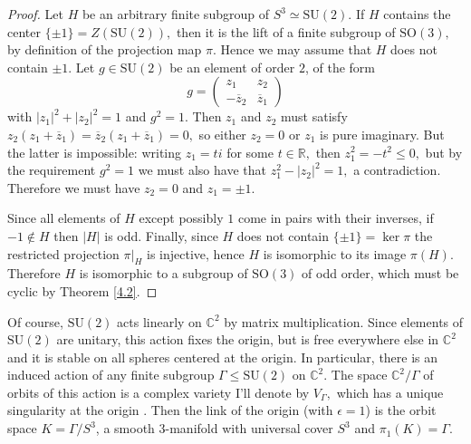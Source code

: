 \documentclass{article}
\begin{document}
\begin{proof}
Let $H$ be an arbitrary finite subgroup of $S^3 \simeq \mathrm{SU}(2)$. If $H$ contains the center $\{\pm 1\} = Z(\mathrm{SU}(2)),$ then it is the lift of a finite subgroup of $\mathrm{SO}(3),$ by definition of the projection map $\pi.$ Hence we may assume that $H$ does not contain $\pm 1$. Let $g \in \mathrm{SU}(2)$ be an element of order $2$, of the form
\[g = \begin{pmatrix} z_1 & z_2\\ -\overline{z}_2 & \overline{z}_1\end{pmatrix}\]
with $|z_1|^2 + |z_2|^2 = 1$ and $g^2 =1$. Then $z_1$ and $z_2$ must satisfy $z_2(z_1 + \overline{z}_1) = \overline{z}_2(z_1 + \overline{z}_1) = 0,$ so either $z_2 = 0$ or $z_1$ is pure imaginary. But the latter is impossible: writing $z_1 = ti$ for some $t \in \mathbb{R},$ then $z_1^2 = -t^2 \leq 0,$ but by the requirement $g^2 = 1$ we must also have that $z_1^2 - |z_2|^2 = 1,$ a contradiction. Therefore we must have $z_2 = 0$ and $z_1 = \pm 1$.

Since all elements of $H$ except possibly $1$ come in pairs with their inverses, if $-1 \not\in H$ then $|H|$ is odd. Finally, since $H$ does not contain $\{\pm 1\} = \ker \pi$ the restricted projection $\pi|_{H}$ is injective, hence $H$ is isomorphic to its image $\pi(H).$ Therefore $H$ is isomorphic to a subgroup of $\mathrm{SO}(3)$ of odd order, which must be cyclic by Theorem \ref{4.2}.

\end{proof}

Of course, $\mathrm{SU}(2)$ acts linearly on $\mathbb{C}^2$ by matrix multiplication. Since elements of $\mathrm{SU}(2)$ are unitary, this action fixes the origin, but is free everywhere else in $\mathbb{C}^2$ and it is stable on all spheres centered at the origin. In particular, there is an induced action of any finite subgroup $\Gamma \leq \mathrm{SU}(2)$ on $\mathbb{C}^2$. The space $\mathbb{C}^2/\Gamma$ of orbits of this action is a complex variety I'll denote by $V_{\Gamma},$ which has a unique singularity at the origin \cite{hirzebruch_1987}. Then the link of the origin (with $\epsilon=1$) is the orbit space $K = \Gamma/S^3$, a smooth $3$-manifold with universal cover $S^3$ and $\pi_1(K) = \Gamma$.
\end{document}
